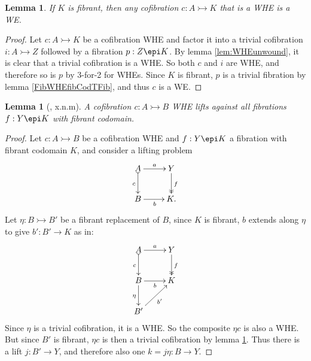 \documentclass[12pt]{article}
\newcommand{\mono}{\ensuremath{\rightarrowtail}}
\newcommand{\ra}{\ensuremath{\rightarrow}}
\newtheorem{lemma}[theorem]{Lemma}
\theoremstyle{remark}
\theoremstyle{definition}
\begin{document}
\begin{lemma}\label{CofWHEfibCodTCof}
If $K$ is fibrant, then any cofibration $c : A \mono K$ that is a WHE is a WE.
\end{lemma}
\begin{proof}
Let $c : A \mono K$ be a cofibration WHE and factor it into a trivial cofibration $i : A\mono Z$ followed by a fibration $p: Z\epi K$.  By lemma \ref{lem:WHEunwound}, it is clear that a trivial cofibration is a WHE.  So both 
$c$ and $i$ are WHE, and therefore so is $p$ by 3-for-2 for WHEs.   Since $K$ is fibrant, $p$ is a trivial fibration by lemma \ref{FibWHEfibCodTFib}, and thus $c$ is a WE.  
\end{proof}

\begin{lemma}[\cite{Cisinski:??}, x.n.m]\label{lemma:CofWHEiffFibLift}
A cofibration $ c : A \mono B$ WHE lifts against all fibrations $f : Y\epi K$ with fibrant codomain.
\end{lemma}
%
\begin{proof}
Let $c : A\mono B$ be a cofibration WHE and  $f : Y\epi K$ a fibration with fibrant codomain $K$, and consider a lifting problem
\begin{equation*}%
\xymatrix{
A \ar@{>->}[d]_{c} \ar[r]^-{a}  & Y \ar@{>>}[d]^{f} \\
B \ar[r]_{b} &  K.
}
\end{equation*}
Let $\eta : B\mono B'$ be a fibrant replacement of $B$, since $K$ is fibrant, $b$ extends along $\eta$ to give $b' : B'\ra K$ as in:   
\begin{equation*}%
\xymatrix{
A \ar@{>->}[d]_{c} \ar[r]^-{a}  & Y \ar@{>>}[d]^{f} \\
B \ar[r]_{b} \ar[d]_\eta &  K\\
B' \ar[ru]_{b'} & 
}
\end{equation*}
Since $\eta$ is a trivial cofibration, it is a WHE. So the composite $\eta c$ is also a WHE.  But since $B'$ is fibrant, $\eta c$ is then a trivial cofibration by lemma \ref{CofWHEfibCodTCof}.  Thus there is a lift $j : B'\ra Y$, and therefore also one $k = j\eta : B\ra Y$. 
%
\end{proof}
\end{document}
